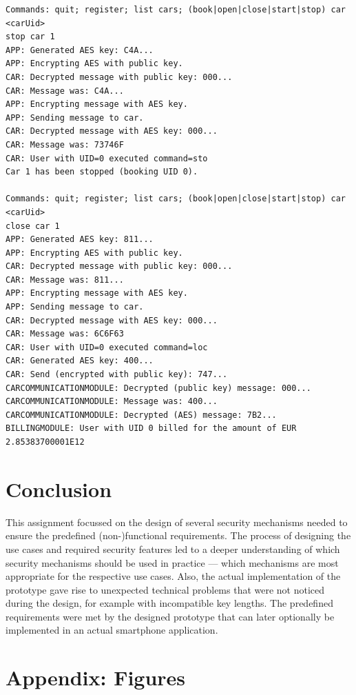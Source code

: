 \documentclass[12pt,a4paper, oneside]{article}
\begin{document}
\begin{lstlisting}[caption=Example execution, label=lst:execution, numbers=none, keywords={},keywordstyle=\ttfamily]
Commands: quit; register; list cars; (book|open|close|start|stop) car <carUid>
stop car 1
APP: Generated AES key: C4A...
APP: Encrypting AES with public key.
CAR: Decrypted message with public key: 000...
CAR: Message was: C4A...
APP: Encrypting message with AES key.
APP: Sending message to car.
CAR: Decrypted message with AES key: 000...
CAR: Message was: 73746F
CAR: User with UID=0 executed command=sto
Car 1 has been stopped (booking UID 0).

Commands: quit; register; list cars; (book|open|close|start|stop) car <carUid>
close car 1
APP: Generated AES key: 811...
APP: Encrypting AES with public key.
CAR: Decrypted message with public key: 000...
CAR: Message was: 811...
APP: Encrypting message with AES key.
APP: Sending message to car.
CAR: Decrypted message with AES key: 000...
CAR: Message was: 6C6F63
CAR: User with UID=0 executed command=loc
CAR: Generated AES key: 400...
CAR: Send (encrypted with public key): 747...
CARCOMMUNICATIONMODULE: Decrypted (public key) message: 000...
CARCOMMUNICATIONMODULE: Message was: 400...
CARCOMMUNICATIONMODULE: Decrypted (AES) message: 7B2...
BILLINGMODULE: User with UID 0 billed for the amount of EUR 2.85383700001E12
\end{lstlisting}\par




\section{Conclusion}
This assignment focussed on the design of several security mechanisms needed to ensure the predefined (non-)functional requirements. The process of designing the use cases and required security features led to a deeper understanding of which security mechanisms should be used in practice --- which mechanisms are most appropriate for the respective use cases. Also, the actual implementation of the prototype gave rise to unexpected technical problems that were not noticed during the design, for example with incompatible key lengths. The predefined requirements were met by the designed prototype that can later optionally be implemented in an actual smartphone application.

\appendix
\section{Appendix: Figures}\label{appendix}
\end{document}
